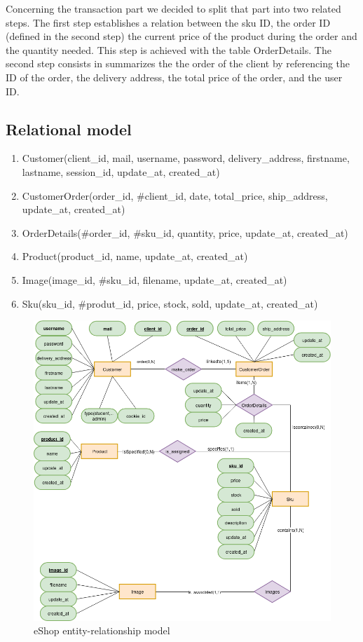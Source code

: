 \documentclass{article}
\begin{document}
Concerning the transaction part we decided to split that part into two related steps. The first step establishes a relation between the sku ID, the order ID (defined in the second step) the  current price of the product during the order and the quantity needed. This step is achieved with the table OrderDetails. The second step consists in summarizes the the order of the client by referencing the ID of the order, the delivery address, the total price of the order, and  the user ID.

\subsection{Relational model}
\begin{enumerate}
\item Customer(client\_id, mail, username, password, delivery\_address, firstname, lastname, session\_id, update\_at, created\_at)
\item CustomerOrder(order\_id, \#client\_id, date, total\_price, ship\_address, update\_at, created\_at)
\item OrderDetails(\#order\_id, \#sku\_id, quantity, price, update\_at, created\_at)
\item Product(product\_id, name, update\_at, created\_at)
\item Image(image\_id, \#sku\_id, filename, update\_at, created\_at)
\item Sku(sku\_id, \#produt\_id, price, stock, sold, update\_at, created\_at)
\end{enumerate}

\begin{figure}[h!]
    \centering
    \includegraphics[scale=0.4]{./images/ecommercev2_er.png}
    \caption{eShop entity-relationship model}
    \label{ecommerce_er}
\end{figure}
\end{document}
